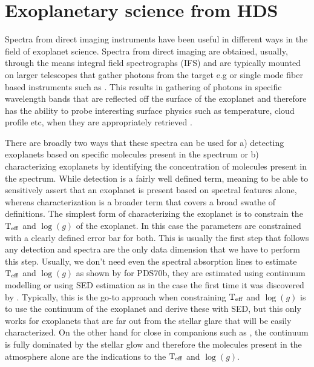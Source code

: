 \section{Exoplanetary science from HDS}
Spectra from direct imaging instruments have been useful in different ways in the field of exoplanet science. 
Spectra from direct imaging are obtained, usually, through the means integral field spectrographs (IFS) and are typically mounted on larger telescopes that gather photons from the target e.g \citep[e.g][]{2004SINFONI,2019SPHERE} or single mode fiber based instruments such as \citep[e.g][]{2019KPIC}.
This results in gathering of photons in specific wavelength bands that are reflected off the surface of the exoplanet and therefore has the ability to probe interesting surface physics such as temperature, cloud profile etc, when they are appropriately retrieved \citep[e.g][]{2019PICASO}.

There are broadly two ways that these spectra can be used for a) detecting exoplanets based on specific molecules present in the spectrum or b) characterizing exoplanets by identifying the concentration of molecules present in the spectrum.
While detection is a fairly well defined term, meaning to be able to sensitively assert that an exoplanet is present based on spectral features alone, whereas characterization is a broader term that covers a broad swathe of definitions.
The simplest form of characterizing the exoplanet is to constrain the $\rm{T_{eff}}$ and $\log(g)$ of the exoplanet.
In this case the parameters are constrained with a clearly defined error bar for both.
This is usually the first step that follows any detection and spectra are the only data dimension that we have to perform this step.
Usually, we don't need even the spectral absorption lines to estimate $\rm{T_{eff}}$ and $\log(g)$ as shown by \citep[e.g][]{2023Cugno} for PDS70b, they are estimated using continuum modelling or using SED estimation as in the case the first time it was discovered by \cite{2019MesaPDS70}.
Typically, this is the go-to approach when constraining $\rm{T_{eff}}$ and $\log(g)$ is to use the continuum of the exoplanet and derive these with SED, but this only works for exoplanets that are far out from the stellar glare that will be easily characterized.
On the other hand for close in companions such as \citep[HD142527b, ][]{2018A&ChristiaensHD142527}, the continuum is fully dominated by the stellar glow and therefore the molecules present in the atmosphere alone are the indications to the $\rm{T_{eff}}$ and $\log(g)$.


